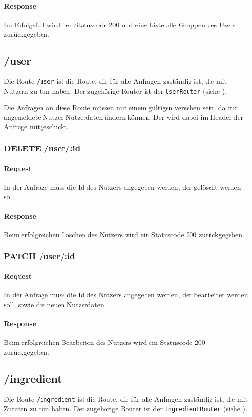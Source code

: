 \documentclass{entwurfsheft}
\begin{document}
    \paragraph{Response}
        Im Erfolgsfall wird der Statuscode 200 und eine Liste alle Gruppen des Users zurückgegeben.

\subsection{/user}
Die Route \texttt{/user} ist die Route, die für alle Anfragen zuständig ist, die mit Nutzern zu tun haben.
Der zugehörige Router ist der \texttt{UserRouter} (siehe ).

Die Anfragen an diese Route müssen mit einem gültigen  versehen sein, da nur angemeldete Nutzer Nutzerdaten ändern können.
Der  wird dabei im Header der Anfrage mitgeschickt.

\subsubsection*{DELETE /user/:id}
\paragraph{Request}
In der Anfrage muss die Id des Nutzers angegeben werden, der gelöscht werden soll.
\paragraph{Response}
Beim erfolgreichen Löschen des Nutzers wird ein Statuscode 200 zurückgegeben.

\subsubsection*{PATCH /user/:id}
\paragraph{Request}
In der Anfrage muss die Id des Nutzers angegeben werden, der bearbeitet werden soll, sowie die neuen Nutzerdaten.
\paragraph{Response}
Beim erfolgreichen Bearbeiten des Nutzers wird ein Statuscode 200 zurückgegeben.

\subsection{/ingredient}
Die Route \texttt{/ingredient} ist die Route, die für alle Anfragen zuständig ist, die mit Zutaten zu tun haben.
Der zugehörige Router ist der \texttt{IngredientRouter} (siehe ).
\end{document}
